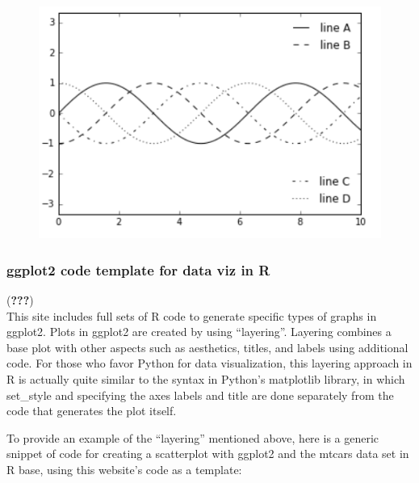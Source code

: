 \documentclass[]{book}
\theoremstyle{definition}
\theoremstyle{definition}
\theoremstyle{definition}
\theoremstyle{remark}
\begin{document}
\begin{figure}
\centering
\includegraphics{images/legend5.png}
\caption{}
\end{figure}

\subsubsection{ggplot2 code template for data viz in
R}\label{ggplot2-code-template-for-data-viz-in-r}

({\textbf{???}})\\
This site includes full sets of R code to generate specific types of
graphs in ggplot2. Plots in ggplot2 are created by using ``layering''.
Layering combines a base plot with other aspects such as aesthetics,
titles, and labels using additional code. For those who favor Python for
data visualization, this layering approach in R is actually quite
similar to the syntax in Python's matplotlib library, in which
set\_style and specifying the axes labels and title are done separately
from the code that generates the plot itself.

To provide an example of the ``layering'' mentioned above, here is a
generic snippet of code for creating a scatterplot with ggplot2 and the
mtcars data set in R base, using this website's code as a template:
\end{document}
